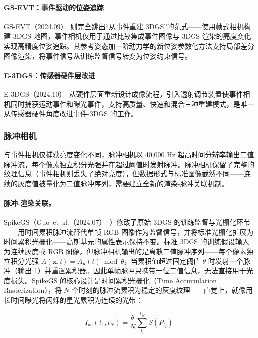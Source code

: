 \paragraph{GS-EVT：事件驱动的位姿追踪}
GS-EVT（2024.09）~\cite{2409_19228}则完全跳出“从事件重建 3DGS”的范式——使用帧式相机构建 3DGS 地图，事件相机仅用于通过比较集成事件图像与 3DGS 渲染的亮度变化实现高精度位姿追踪。其参考姿态加一阶动力学的新位姿参数化方法支持局部差分图像渲染，将事件信号从训练监督信号转变为位姿约束信号。

\paragraph{E-3DGS：传感器硬件层改进}
E-3DGS（2024.10）~\cite{2410_16995}从硬件层面重新设计成像流程，引入透射调节装置使事件相机同时捕获运动事件和曝光事件，支持高质量、快速和混合三种重建模式，是唯一从传感器硬件角度改进事件-3DGS 的工作。

\subsubsection{脉冲相机}

与事件相机仅捕获亮度变化不同，脉冲相机以 40,000 Hz 超高时间分辨率输出二值脉冲流，每个像素独立积分光强并在超过阈值时发射脉冲。脉冲相机保留了完整的纹理信息（事件相机则丢失了绝对亮度），但数据形式与标准图像截然不同——连续的灰度值被量化为二值脉冲序列，需要建立全新的渲染-脉冲关联机制。

\paragraph{脉冲-渲染关联。} SpikeGS（Guo~et~al.（2024.07）~\cite{2407_03771}）修改了原始 3DGS 的训练监督与光栅化环节——用时间累积脉冲流替代单帧 RGB 图像作为监督信号，并将标准光栅化扩展为时间累积光栅化——高斯基元的属性表示保持不变。标准 3DGS 的训练假设输入为连续灰度或 RGB 图像，但脉冲相机输出的是离散二值脉冲序列——每个像素独立积分光强 $A(\mathbf{x}, t) = A_{\mathbf{x}}(t) \bmod \theta$，当累积值超过固定阈值 $\theta$ 时发射一个脉冲（输出 1）并重置累积器。因此单帧脉冲只携带一位二值信息，无法直接用于光度损失。SpikeGS 的核心设计是时间累积光栅化（Time Accumulation Rasterization），将 $N$ 个时刻的脉冲流累积为稳定的灰度纹理——直觉上，就像用长时间曝光将闪烁的星光累积为连续的光带：

\begin{equation}
I_{\mathrm{ac}}(t_1, t_N) = \frac{\theta}{N} \sum_{t_i}^{t_N} S(P_{t_i})
\end{equation}

